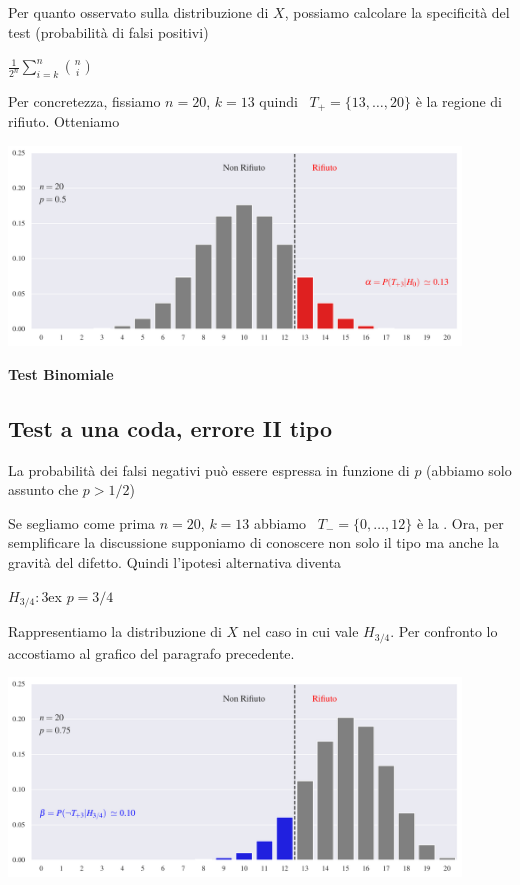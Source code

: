 \documentclass[11pt,openany]{book}
\def\emph#1{\textcolor{blue}{\textbf{\boldmath #1}}}
\renewcommand*{\emph}[1]{%
   \smash{\tikz[baseline]\node[rectangle, fill=teal!25, rounded corners, inner xsep=0.5ex, inner ysep=0.2ex, anchor=base, minimum height = 2.7ex]{#1};}}
\begin{document}
Per quanto osservato sulla distribuzione di $X$, possiamo calcolare la specificità del test (probabilità di falsi positivi)



\medrel{=}$\displaystyle\frac1{2^n}\sum^n_{i=k} {n\choose i}$


Per concretezza, fissiamo $n=20$, $k=13$ quindi {\color{red}\boldmath\ $T_+=\{13,\dots,20\}$} è la regione di rifiuto. Otteniamo %


\hfil\includegraphics[width=0.9\textwidth]{figure/B-test_01.pdf}


\hfill{}\clearpage\hfill\textbf{Test Binomiale}\subsection{Test a una coda, errore II tipo}

La probabilità dei falsi negativi può essere espressa in funzione di $p$ (abbiamo solo assunto che $p>1/2$)



Se segliamo come prima $n=20$, $k=13$ abbiamo {\color{blue}\boldmath\ $T_-=\{0,\dots,12\}$} è la \emph{zona di NON rifiuto}.
Ora, per semplificare la discussione supponiamo di conoscere non solo il tipo ma anche la gravità del difetto. Quindi l'ipotesi alternativa diventa

$H_{3/4}:$\kern3ex $p=3/4$

Rappresentiamo la distribuzione di $X$ nel caso in cui vale $H_{3/4}$. Per confronto lo accostiamo al grafico del paragrafo precedente. 


\hfil\includegraphics[width=0.9\textwidth]{figure/B-test_02.pdf}
\end{document}
